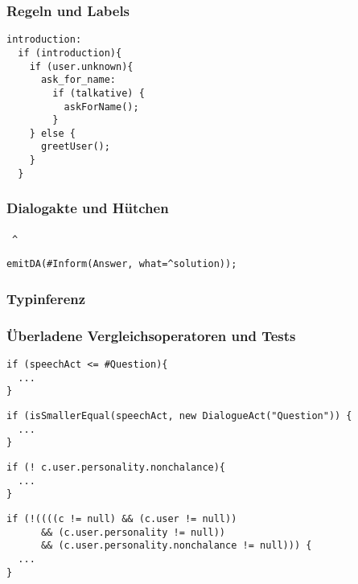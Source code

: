 \subsubsection{Regeln und Labels}

\begin{verbatim}
introduction:
  if (introduction){
    if (user.unknown){
      ask_for_name:
        if (talkative) {
          askForName();
        }
    } else {
      greetUser();
    }
  }
\end{verbatim}


\subsubsection{Dialogakte und Hütchen} \ {\Large\verb|^|}

\begin{verbatim}
emitDA(#Inform(Answer, what=^solution));
\end{verbatim}

\subsubsection{Typinferenz} \label{rudimant-Typinferenz}

\subsubsection{Überladene Vergleichsoperatoren und Tests}

\begin{minipage}{0.4\textwidth}
\begin{verbatim}
if (speechAct <= #Question){
  ...
}
\end{verbatim}
\end{minipage}
\begin{minipage}{0.6\textwidth}
\begin{verbatim}
if (isSmallerEqual(speechAct, new DialogueAct("Question")) {
  ...
}
\end{verbatim}
\end{minipage}

\begin{minipage}{0.4\textwidth}
\begin{verbatim}
if (! c.user.personality.nonchalance){
  ...
}
\end{verbatim}
\end{minipage}
\begin{minipage}{0.6\textwidth}
\begin{verbatim}
if (!((((c != null) && (c.user != null))
      && (c.user.personality != null))
      && (c.user.personality.nonchalance != null))) {
  ...
}
\end{verbatim}
\end{minipage}

